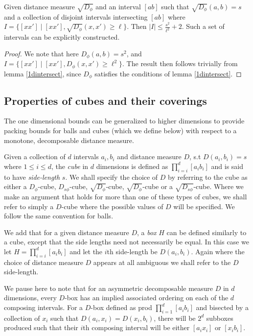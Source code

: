 \documentclass[11pt]{myclass}
\newcommand{\breg}{\ensuremath{D_\phi}}
\newcommand{\sbreg}{\ensuremath{D_{s\phi}}}
\begin{document}
\begin{lemma}\label{1dsqrtbregint}
 Given distance measure $\sqrt{\breg}$ and an interval $[ab]$ such that $\sqrt{\breg}(a,b) = s$ and a collection of disjoint intervals intersecting $[ab]$
where $I = \{[x x'] \mid [x x'] , \sqrt{\breg}(x, x') \geq \ell \}$. Then  $|I| \leq \frac{s^2}{\ell^2}+2$. Such a set of intervals can be explicitly constructed.
\end{lemma}

\begin{proof}
 We note that here $\breg(a,b)  = s^2$, and $I = \{[x x'] \mid [x x'] , \breg(x, x') \geq \ell^2 \}$. The result then follows trivially from lemma \ref{1dintersect},
since $\breg$ satisfies the conditions of lemma \ref{1dintersect}.
\end{proof}


\subsection{Properties of cubes and their coverings}
 The one dimensional bounds can be generalized to higher dimensions to provide packing bounds for 
balls and cubes (which we define below) with respect to a monotone, decomposable distance measure. 


\begin{defn} \label{cube}
 Given a collection of $d$ intervals $a_i, b_i$ and distance measure $D$, s.t $D(a_i, b_i) = s$ where $1 \leq i \leq d$, the \emph{cube} in $d$ dimensions is defined as $\prod_{i=i}^{d} [a_i b_i]$ and is said to have \emph{side-length} $s$. We shall specify the choice of $D$ by referring to the cube as either a $\breg$-cube, $\sbreg$-cube, $\sqrt{\breg}$-cube, $\sqrt{\breg}$-cube or a
 $\sqrt{\sbreg}$-cube. Where we make an argument that holds for more than one of these types of cubes, we shall refer to simply a
 $D$-cube where the possible values of $D$ will be specified. We follow the same convention for balls.
 \end{defn}

  We add that for a given distance measure $D$, a \emph{box} $H$ can be defined similarly to
a cube, except that the side lengths need not necessarily be equal. In this case we let $H = \prod_{i=i}^{d} [a_i b_i]$
and let the $i$th side-length be $D(a_i,b_i)$. Again where the choice of distance measure $D$ appears at all ambiguous we shall refer to the $D$ side-length. 

We pause here to note that for an asymmetric decomposable measure $D$ in $d$ dimensions, every $D$-box has an implied associated ordering on each of the $d$ composing intervals. For a $D$-box defined as prod $\prod_{i=1}^d [a_i b_i]$ and bisected by a collection of $x_i$
such that $D(a_i,x_i) = D(x_i,b_i)$, there will be $2^d$ subboxes produced such that their $i$th composing interval will
be either $[a_i x_i]$ or $[x_i b_i]$.
\end{document}
